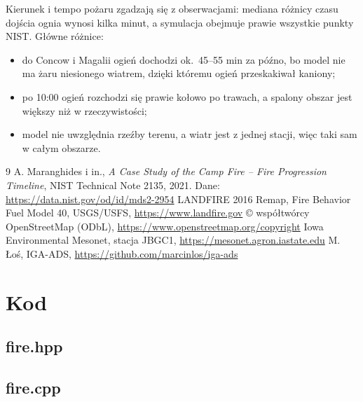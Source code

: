 \documentclass[11pt,a4paper]{article}
\begin{document}
Kierunek i tempo pożaru zgadzają się z obserwacjami: mediana różnicy czasu dojścia ognia
wynosi kilka minut, a symulacja obejmuje prawie wszystkie punkty NIST. Główne różnice:
\begin{itemize}
\item do Concow i Magalii ogień dochodzi ok.\ 45--55 min za późno, bo model nie ma żaru
  niesionego wiatrem, dzięki któremu ogień przeskakiwał kaniony;
\item po 10:00 ogień rozchodzi się prawie kołowo po trawach, a spalony obszar jest
  większy niż w rzeczywistości;
\item model nie uwzględnia rzeźby terenu, a wiatr jest z jednej stacji, więc taki sam w całym obszarze.
\end{itemize}

\begin{thebibliography}{9}
 A. Maranghides i in., \emph{A Case Study of the Camp Fire -- Fire Progression
  Timeline}, NIST Technical Note 2135, 2021. Dane: \url{https://data.nist.gov/od/id/mds2-2954}
 LANDFIRE 2016 Remap, Fire Behavior Fuel Model 40, USGS/USFS,
  \url{https://www.landfire.gov}
 \copyright{} współtwórcy OpenStreetMap (ODbL), \url{https://www.openstreetmap.org/copyright}
 Iowa Environmental Mesonet, stacja JBGC1, \url{https://mesonet.agron.iastate.edu}
 M. Łoś, IGA-ADS, \url{https://github.com/marcinlos/iga-ads}
\end{thebibliography}

\appendix
\section{Kod}
\label{sec:kod}

\subsection*{fire.hpp}


\subsection*{fire.cpp}

\end{document}
